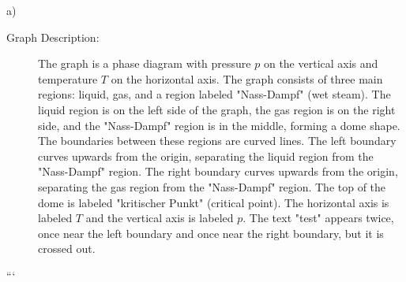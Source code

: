 a) 

\begin{description}
    \item[Graph Description:] The graph is a phase diagram with pressure \( p \) on the vertical axis and temperature \( T \) on the horizontal axis. The graph consists of three main regions: liquid, gas, and a region labeled "Nass-Dampf" (wet steam). The liquid region is on the left side of the graph, the gas region is on the right side, and the "Nass-Dampf" region is in the middle, forming a dome shape. The boundaries between these regions are curved lines. The left boundary curves upwards from the origin, separating the liquid region from the "Nass-Dampf" region. The right boundary curves upwards from the origin, separating the gas region from the "Nass-Dampf" region. The top of the dome is labeled "kritischer Punkt" (critical point). The horizontal axis is labeled \( T \) and the vertical axis is labeled \( p \). The text "test" appears twice, once near the left boundary and once near the right boundary, but it is crossed out.
\end{description}

```